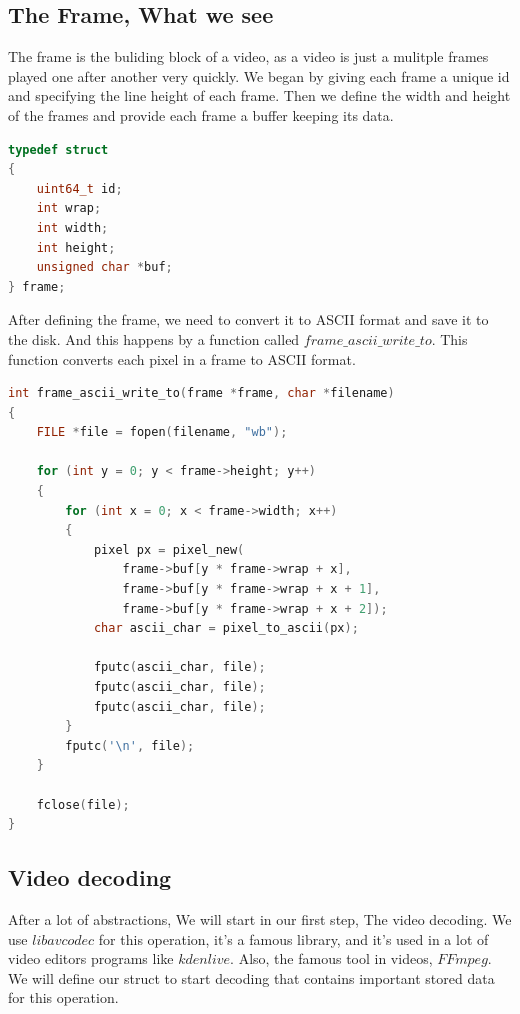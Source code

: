 \documentclass[a4paper,12pt]{article}
\begin{document}
\subsection{The Frame, What we see}

The frame is the buliding block of a video, as a video is just a mulitple frames played one after another very quickly.
We began by giving each frame a unique id and specifying the line height of each frame. Then we define the width and height of the frames and provide each frame a buffer keeping its data.


\begin{lstlisting}[language=c]
typedef struct
{
    uint64_t id;
    int wrap;
    int width;
    int height;
    unsigned char *buf;
} frame;
\end{lstlisting}
\newpage

After defining the frame, we need to convert it to ASCII format and save it to the disk. And this happens by a function called $frame\_ascii\_write\_to$. This function converts each pixel in a frame to ASCII format.

\begin{lstlisting}[language=c]
int frame_ascii_write_to(frame *frame, char *filename)
{
    FILE *file = fopen(filename, "wb");

    for (int y = 0; y < frame->height; y++)
    {
        for (int x = 0; x < frame->width; x++)
        {
            pixel px = pixel_new(
                frame->buf[y * frame->wrap + x],
                frame->buf[y * frame->wrap + x + 1],
                frame->buf[y * frame->wrap + x + 2]);
            char ascii_char = pixel_to_ascii(px);

            fputc(ascii_char, file);
            fputc(ascii_char, file);
            fputc(ascii_char, file);
        }
        fputc('\n', file);
    }

    fclose(file);
}
\end{lstlisting}

\subsection{Video decoding}
After a lot of abstractions, We will start in our first step, The video decoding. We use $libavcodec$ for this operation, it's a famous library, and it's used in a lot of video editors programs like $kdenlive$. Also, the famous tool in videos, $FFmpeg$.\\ 

We will define our struct to start decoding that contains important stored data for this operation.
\end{document}
